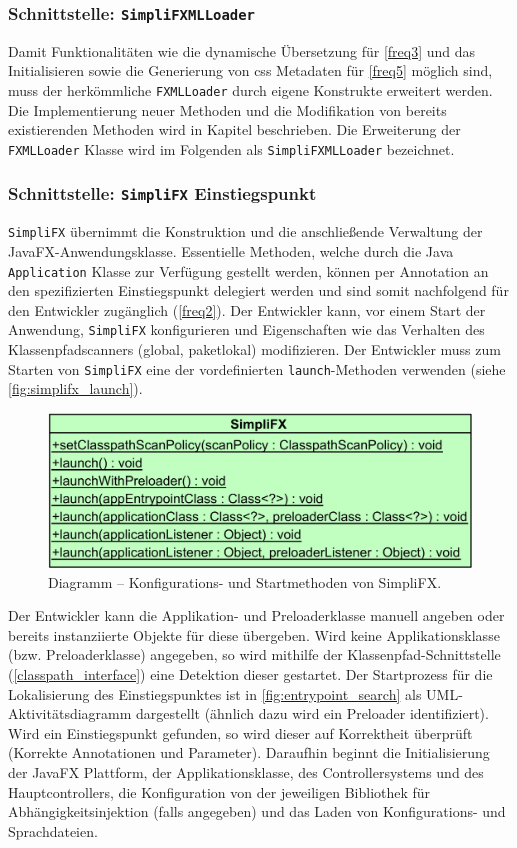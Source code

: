 \subsubsection{Schnittstelle: \texttt{SimpliFXMLLoader}}
Damit Funktionalitäten wie die dynamische Übersetzung für \autoref{freq3} und das Initialisieren sowie die Generierung von \ac{css} Metadaten für \autoref{freq5} möglich sind, muss der herkömmliche \texttt{FXMLLoader} durch eigene Konstrukte erweitert werden. Die Implementierung neuer Methoden und die Modifikation von bereits existierenden Methoden wird in Kapitel  beschrieben. Die Erweiterung der \texttt{FXMLLoader} Klasse wird im Folgenden als \texttt{SimpliFXMLLoader} bezeichnet.
\subsubsection{Schnittstelle: \texttt{SimpliFX} Einstiegspunkt}
\texttt{SimpliFX} übernimmt die Konstruktion und die anschließende Verwaltung der JavaFX-Anwendungsklasse. Essentielle Methoden, welche durch die Java \texttt{Application} Klasse zur Verfügung gestellt werden, können per Annotation an den spezifizierten Einstiegspunkt delegiert werden und sind somit nachfolgend für den Entwickler zugänglich (\autoref{freq2}). Der Entwickler kann, vor einem Start der Anwendung, \texttt{SimpliFX} konfigurieren und Eigenschaften wie das Verhalten des Klassenpfadscanners (global, paketlokal) modifizieren. Der Entwickler muss zum Starten von \texttt{SimpliFX} eine der vordefinierten \texttt{launch}-Methoden verwenden (siehe \autoref{fig:simplifx_launch}). 
\begin{figure}[H]
	\centering
	\includegraphics[width=\textwidth-2cm]{Abbildungen/SimpliFX Einstiegspunkt.png}
	\caption{Diagramm -- Konfigurations- und Startmethoden von SimpliFX.}
	\label{fig:simplifx_launch}
\end{figure}
\noindent Der Entwickler kann die Applikation- und Preloaderklasse manuell angeben oder bereits instanziierte Objekte für diese übergeben. Wird keine Applikationsklasse (bzw. Preloaderklasse) angegeben, so wird mithilfe der Klassenpfad-Schnittstelle (\autoref{classpath_interface}) eine Detektion dieser gestartet. Der Startprozess für die Lokalisierung des Einstiegspunktes ist in \autoref{fig:entrypoint_search} als UML-Aktivitätsdiagramm dargestellt (ähnlich dazu wird ein Preloader identifiziert). Wird ein Einstiegspunkt gefunden, so wird dieser auf Korrektheit überprüft (Korrekte Annotationen und Parameter). Daraufhin beginnt die Initialisierung der JavaFX Plattform, der Applikationsklasse, des Controllersystems und des Hauptcontrollers, die Konfiguration von der jeweiligen Bibliothek für Abhängigkeitsinjektion (falls angegeben) und das Laden von Konfigurations- und Sprachdateien.
